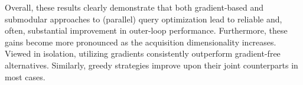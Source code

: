 Overall, these results clearly demonstrate that both gradient-based and submodular approaches to (parallel) query optimization lead to reliable and, often, substantial improvement in outer-loop performance. Furthermore, these gains become more pronounced as the acquisition dimensionality increases. Viewed in isolation, \solvers{} utilizing gradients consistently outperform gradient-free alternatives. Similarly, greedy strategies improve upon their joint counterparts in most cases.
